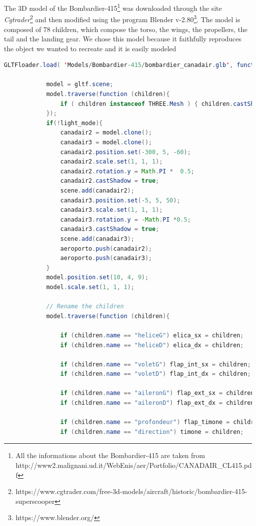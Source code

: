 \documentclass{article}
\begin{document}
The 3D model of the Bombardier-415\footnote{All the informations about the Bombardier-415 are taken from http://www2.malignani.ud.it/WebEnis/aer/Portfolio/CANADAIR\_CL415.pdf} was downloaded through the site \textit{Cgtrader}\footnote{https://www.cgtrader.com/free-3d-models/aircraft/historic/bombardier-415-superscooper} and then modified using the program Blender v-2.80\footnote{https://www.blender.org/}. The model is composed of 78 children, which compose the torso, the wings, the propellers, the tail and the landing gear. We chose this model because it faithfully reproduces the object we wanted to recreate and it is easily modeled

\begin{lstlisting}[language=Java, caption=Bombardier-415 loader]
GLTFloader.load( 'Models/Bombardier-415/bombardier_canadair.glb', function ( gltf ) {

            model = gltf.scene;
            model.traverse(function (children){
				if ( children instanceof THREE.Mesh ) { children.castShadow = true; }
            });
            if(!light_mode){
                canadair2 = model.clone();
                canadair3 = model.clone();
                canadair2.position.set(-300, 5, -60);
                canadair2.scale.set(1, 1, 1);
                canadair2.rotation.y = Math.PI *  0.5;
                canadair2.castShadow = true;
                scene.add(canadair2);
                canadair3.position.set(-5, 5, 50);
                canadair3.scale.set(1, 1, 1);
                canadair3.rotation.y = -Math.PI *0.5;
                canadair3.castShadow = true;
                scene.add(canadair3);
                aeroporto.push(canadair2);
                aeroporto.push(canadair3);
            }
            model.position.set(10, 4, 9);
            model.scale.set(1, 1, 1);

            // Rename the children
            model.traverse(function (children){

                if (children.name == "heliceG") elica_sx = children;
                if (children.name == "heliceD") elica_dx = children;

                if (children.name == "voletG") flap_int_sx = children;
                if (children.name == "voletD") flap_int_dx = children;

                if (children.name == "aileronG") flap_ext_sx = children;
                if (children.name == "aileronD") flap_ext_dx = children;

                if (children.name == "profondeur") flap_timone = children;
                if (children.name == "direction") timone = children;


\end{lstlisting}
\end{document}
